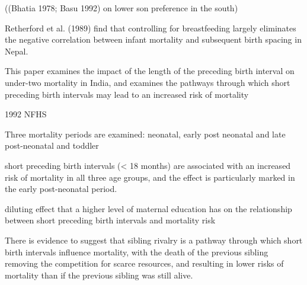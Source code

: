 ((Bhatia 1978; Basu 1992) on lower son preference in the south)

Retherford et al. (1989) find that controlling for breastfeeding largely
eliminates the negative correlation between infant mortality and
subsequent birth spacing in Nepal.

\citep{Whitworth2002}

This paper examines the impact of the length of the preceding birth
interval on under-two mortality in India, and examines the pathways
through which short preceding birth intervals may lead to an increased
risk of mortality

1992 NFHS

Three mortality periods are examined: neonatal, early post neonatal and
late post-neonatal and toddler 

short preceding birth intervals (< 18 months) are associated with an
increased risk of mortality in all three age groups, and the effect is
particularly marked in the early post-neonatal period.

diluting effect that a higher level of maternal education has on the
relationship between short preceding birth intervals and mortality risk

There is evidence to suggest that sibling rivalry is a pathway through
which short birth intervals inﬂuence mortality, with the death of the
previous sibling removing the competition for scarce resources, and
resulting in lower risks of mortality than if the previous sibling was
still alive.


\citep{Bhalotra2008}


